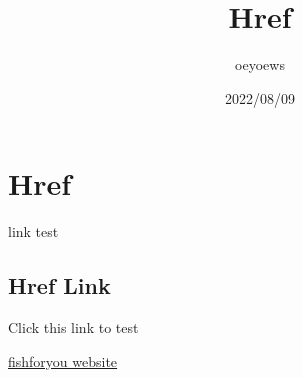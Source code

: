 \documentclass{article}
\title{Href}
\author{oeyoews}
\date{2022/08/09}
\begin{document}
\maketitle

\section*{Href}

link test

\subsection{Href Link}%

Click this link to test

\begin{center}
  \href{https://oeyoew.fun}{fishforyou website}
\end{center}
\end{document}
